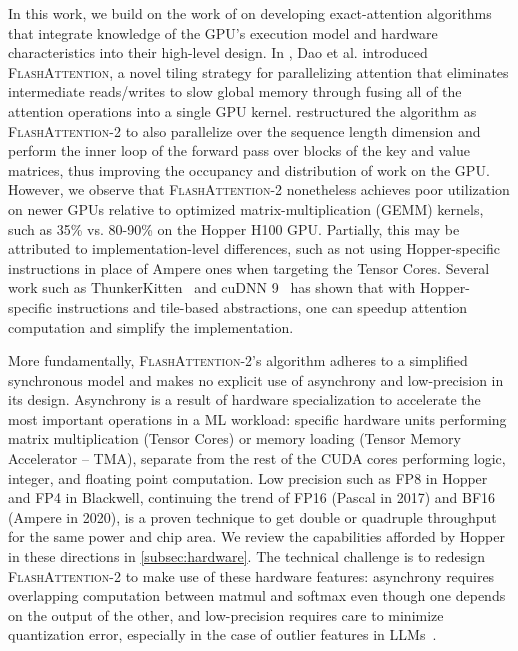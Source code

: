 In this work, we build on the work of \citet{dao2022flashattention} on developing exact-attention algorithms that integrate knowledge of the GPU's execution model and hardware characteristics into their high-level design. In \citep{dao2022flashattention}, Dao et al. introduced \textsc{FlashAttention}, a novel tiling strategy for parallelizing attention that eliminates intermediate reads/writes to slow global memory through fusing all of the attention operations into a single GPU kernel.
\citet{dao2023flashattention2} restructured the algorithm as \textsc{FlashAttention-2} to also parallelize over the sequence length dimension and perform the inner loop of the forward pass over blocks of the key and value matrices, thus improving the occupancy and distribution of work on the GPU. However, we observe that \textsc{FlashAttention-2} nonetheless achieves poor utilization on newer GPUs relative to optimized matrix-multiplication (GEMM) kernels, such as 35\% vs. 80-90\% on the Hopper H100 GPU. Partially, this may be attributed to implementation-level differences, such as not using Hopper-specific instructions in place of Ampere ones when targeting the Tensor Cores. Several work such as ThunkerKitten~\citep{spector2024thunder} and cuDNN 9~\citep{cudnn9} has shown that with Hopper-specific instructions and tile-based abstractions, one can speedup attention computation and simplify the implementation.

More fundamentally, \textsc{FlashAttention-2}'s algorithm adheres to a simplified synchronous model and makes no explicit use of asynchrony and low-precision in its design. Asynchrony is a result of hardware specialization to accelerate the most important operations in a ML workload: specific hardware units performing matrix multiplication (Tensor Cores) or memory loading (Tensor Memory Accelerator -- TMA), separate from the rest of the CUDA cores performing logic, integer, and floating point computation. Low precision such as FP8 in Hopper and FP4 in Blackwell, continuing the trend of FP16 (Pascal in 2017) and BF16 (Ampere in 2020), is a proven technique to get double or quadruple throughput for the same power and chip area. We review the capabilities afforded by Hopper in these directions in \cref{subsec:hardware}.
The technical challenge is to redesign \textsc{FlashAttention-2} to make use of these hardware features: asynchrony requires overlapping computation between matmul and softmax even though one depends on the output of the other, and low-precision requires care to minimize quantization error, especially in the case of outlier features in LLMs~\citep{dettmers2208llm, sun2024massive}.

